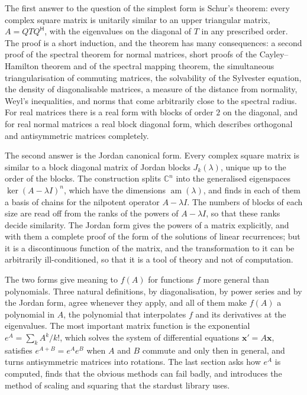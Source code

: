 The first answer to the question of the simplest form is Schur's theorem: every complex square matrix is unitarily similar to an upper triangular matrix, $A=QTQ^{\mathsf H}$, with the eigenvalues on the diagonal of $T$ in any prescribed order. The proof is a short induction, and the theorem has many consequences: a second proof of the spectral theorem for normal matrices, short proofs of the Cayley--Hamilton theorem and of the spectral mapping theorem, the simultaneous triangularisation of commuting matrices, the solvability of the Sylvester equation, the density of diagonalisable matrices, a measure of the distance from normality, Weyl's inequalities, and norms that come arbitrarily close to the spectral radius. For real matrices there is a real form with blocks of order $2$ on the diagonal, and for real normal matrices a real block diagonal form, which describes orthogonal and antisymmetric matrices completely.

The second answer is the Jordan canonical form. Every complex square matrix is similar to a block diagonal matrix of Jordan blocks $J_k(\lambda)$, unique up to the order of the blocks. The construction splits $\mathbb C^n$ into the generalised eigenspaces $\ker(A-\lambda I)^n$, which have the dimensions $\operatorname{am}(\lambda)$, and finds in each of them a basis of chains for the nilpotent operator $A-\lambda I$. The numbers of blocks of each size are read off from the ranks of the powers of $A-\lambda I$, so that these ranks decide similarity. The Jordan form gives the powers of a matrix explicitly, and with them a complete proof of the form of the solutions of linear recurrences; but it is a discontinuous function of the matrix, and the transformation to it can be arbitrarily ill-conditioned, so that it is a tool of theory and not of computation.

The two forms give meaning to $f(A)$ for functions $f$ more general than polynomials. Three natural definitions, by diagonalisation, by power series and by the Jordan form, agree whenever they apply, and all of them make $f(A)$ a polynomial in $A$, the polynomial that interpolates $f$ and its derivatives at the eigenvalues. The most important matrix function is the exponential $e^{A}=\sum_kA^k/k!$, which solves the system of differential equations $\mathbf x'=A\mathbf x$, satisfies $e^{A+B}=e^Ae^B$ when $A$ and $B$ commute and only then in general, and turns antisymmetric matrices into rotations. The last section asks how $e^A$ is computed, finds that the obvious methods can fail badly, and introduces the method of scaling and squaring that the stardust library uses.

